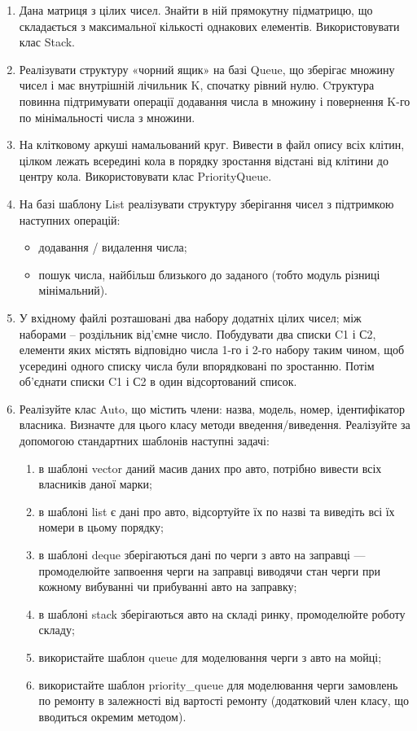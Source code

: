 \documentclass[a5paper,titlepage,openany,twoside,draft]{book_unv}%
\makeatletter
\newcommand{\xslalph}[1]{\expandafter\@xslalph\csname c@#1\endcsname}
\newcommand{\@xslalph}[1]{%
    \ifcase#1\or а\or б\or в\or г\or д\or e\or є\or ж\or з\or i%
    \or й\or к\or л\or м\or н\or о\or п\or р\or с\or т%
    \or у\or ф\or х\or ц\or ч\or ш\or ю\or я\or аа\or бб\or вв%
    \else\@ctrerr\fi%
}
\makeatother
\begin{document}
\begin{enumerate}
\def\labelenumi{\arabic{enumi})}
\setcounter{enumi}{3}

\item
  Дана матриця з цілих чисел. Знайти в ній прямокутну підматрицю, що
  складається з максимальної кількості однакових елементів.
  Використовувати клас Stack.
\item
  Реалізувати структуру «чорний ящик» на базі Queue, що зберігає множину
  чисел і має внутрішній лічильник K, спочатку рівний нулю. Cтруктура
  повинна підтримувати операції додавання числа в множину і повернення
  K-го по мінімальності числа з множини.
\item
  На клітковому аркуші намальований круг. Вивести в файл опису всіх
  клітин, цілком лежать всередині кола в порядку зростання відстані від
  клітини до центру кола. Використовувати клас PriorityQueue.
\item
  На базі шаблону List реалізувати структуру зберігання чисел з
  підтримкою наступних операцій:

  \begin{itemize}
    \item
    додавання / видалення числа;
  \item
    пошук числа, найбільш близького до заданого (тобто модуль різниці
    мінімальний).
  \end{itemize}
\item
  У вхідному файлі розташовані два набору додатніх цілих чисел; між наборами
  -- роздільник від'ємне число. Побудувати два списки C1 і С2, елементи яких
  містять відповідно числа 1-го і 2-го набору таким чином, щоб усередині
  одного списку числа були впорядковані по зростанню. Потім об'єднати
  списки C1 і С2 в один відсортований список.

\item

Реалізуйте клас Auto, що містить члени: назва, модель, номер, ідентифікатор власника.
Визначте для цього класу методи введення/виведення.
Реалізуйте за допомогою стандартних шаблонів наступні задачі:
\begin{enumerate}[label=\xslalph*)]
\item
    в шаблоні vector даний масив даних про авто, потрібно вивести всіх власників даної марки;
\item
    в шаблоні list є дані про авто, відсортуйте їх по назві та виведіть всі їх номери в цьому порядку; 
\item
    в шаблоні deque зберігаються дані по черги з авто на заправці --- промоделюйте запвоення черги
на заправці виводячи стан черги при кожному вибуванні чи прибуванні авто на заправку;
\item
    в шаблоні stack зберігаються авто на складі ринку, промоделюйте роботу складу;
\item
    використайте шаблон queue для моделювання черги з авто на мойці;
\item
    використайте шаблон priority\_queue для моделювання черги замовлень по ремонту в 
залежності від вартості ремонту (додатковий член класу, що вводиться окремим методом). 
\end{enumerate}    


\end{enumerate}
\end{document}
